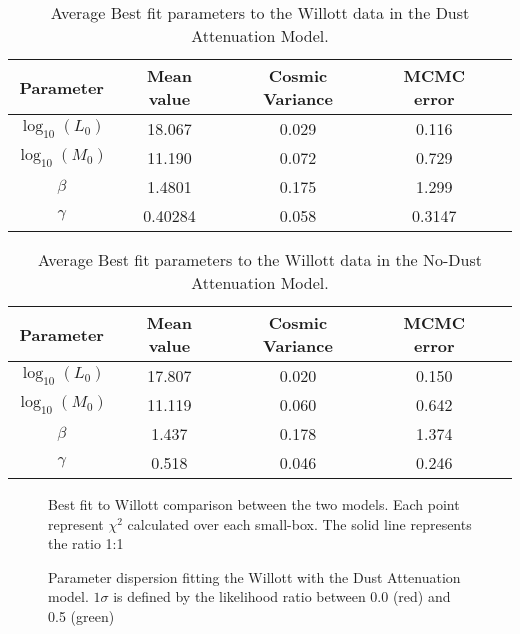\documentclass{emulateapj}
\begin{document}
\begin{table}
\begin{center}
\begin{tabular}{ccccc}\hline\hline
Parameter  & Mean value & Cosmic Variance & MCMC error\\\hline
$\log_{10}(L_0)$   & 18.067   & 0.029   & 0.116 \\
$\log_{10}(M_0)$  & 11.190   & 0.072   & 0.729 \\
$\beta$                  & 1.4801  & 0.175   & 1.299 \\
$\gamma$             & 0.40284 & 0.058  & 0.3147\\
\hline\hline
\end{tabular}
\caption{  Average Best fit parameters to the Willott data in the Dust Attenuation Model.} 
\label{table:Willott_best_fit_parameters}
\end{center}
\end{table}

\begin{table}
\begin{center}
\begin{tabular}{ccccc}\hline\hline
Parameter  & Mean value & Cosmic Variance & MCMC error\\\hline
$\log_{10}(L_0)$   & 17.807   & 0.020   & 0.150 \\
$\log_{10}(M_0)$  & 11.119    & 0.060   & 0.642 \\
$\beta$                  &  1.437    & 0.178   & 1.374 \\
$\gamma$             &   0.518   & 0.046  & 0.246\\
\hline\hline
\end{tabular}
\caption{  Average Best fit parameters to the Willott data in the No-Dust Attenuation Model.} 
\label{table:Willott_best_fit_parameters_no_dust}
\end{center}
\end{table}



\begin{figure}
\caption{Best fit to Willott comparison between the two models. Each point represent $\chi^2$ 
calculated over each small-box. The solid line represents the ratio 1:1 }
\label{fig:OD1_chi2_comparison}
\end{figure}

\begin{figure*}
\caption{Parameter dispersion fitting the Willott with the Dust Attenuation model. 
$1\sigma$ is defined by the likelihood ratio between 0.0 (red) and 0.5 (green)}
\label{fig:OD1_MCMC_best_steps_w}
\end{figure*}
\end{document}
